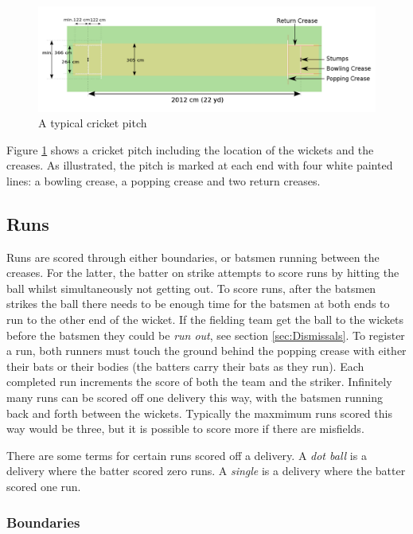 \documentclass[12pt,a4paper]{report}
\theoremstyle{definition}
\begin{document}
\begin{figure}[H]
    \centering
    \includegraphics[width=0.8\linewidth]{Cricket_Pitch.png}
    \caption{A typical cricket pitch \citep{cricketWiki}}
    \label{fig:CricketPitch}
\end{figure}

Figure \ref{fig:CricketPitch} shows a cricket pitch including the location of the wickets and the creases.
As illustrated, the pitch is marked at each end with four white painted lines: a bowling crease, a popping crease and two return creases.

\subsection{Runs} \label{sec:Runs}

Runs are scored through either boundaries, or batsmen running between the creases.
For the latter, the batter on strike attempts to score runs by hitting the ball whilst simultaneously not getting out. 
To score runs, after the batsmen strikes the ball there needs to be enough time for the batsmen at both ends to run to the other end of the wicket.
If the fielding team get the ball to the wickets before the batsmen they could be \emph{run out}, see section \ref{sec:Dismissals}.
To register a run, both runners must touch the ground behind the popping crease with either their bats or their bodies (the batters carry their bats as they run). 
Each completed run increments the score of both the team and the striker.
Infinitely many runs can be scored off one delivery this way, with the batsmen running back and forth between the wickets.
Typically the maxmimum runs scored this way would be three, but it is possible to score more if there are misfields.

There are some terms for certain runs scored off a delivery.
A \emph{dot ball} is a delivery where the batter scored zero runs.
A \emph{single} is a delivery where the batter scored one run.

\subsubsection{Boundaries} \label{sec:Boundaries}
\end{document}
